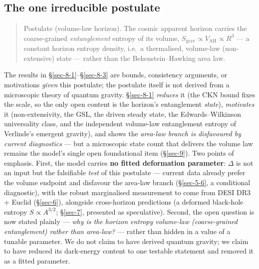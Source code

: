 \documentclass[preprint,12pt]{elsarticle}
\begin{document}
\subsection{The one irreducible postulate}\label{sec-8-4}

\begin{quote}
Postulate (volume-law horizon). The cosmic apparent horizon carries the
coarse-grained \emph{entanglement} entropy of its volume,
\(S_{\mathrm{grav}} \propto  V_\mathrm{AH} \propto  R^{3}\) --- a
constant horizon entropy density, i.e.~a thermalised, volume-law
(non-extensive) state --- rather than the Bekenstein--Hawking area law.
\end{quote}

The results in §\ref{sec-8-1}--§\ref{sec-8-3} are bounds, consistency
arguments, or motivations \emph{given} this postulate; the postulate
itself is not derived from a microscopic theory of quantum gravity.
§\ref{sec-8-1} \emph{reduces} it (the CKN bound fixes the scale, so the
only open content is the horizon's entanglement \emph{state}),
\emph{motivates} it (non-extensivity, the GSL, the driven steady state,
the Edwards--Wilkinson universality class, and the independent
volume-law entanglement entropy of Verlinde's emergent gravity), and
shows the \emph{area-law branch is disfavoured by current diagnostics}
--- but a microscopic state count that delivers the volume law remains
the model's single open foundational item (§\ref{sec-9}). Two points of
emphasis. First, the model carries \textbf{no fitted deformation
parameter}: \(\Delta\) is not an input but the falsifiable \emph{test}
of this postulate --- current data already prefer the volume endpoint
and disfavour the area-law branch (§\ref{sec-5-6}, a conditional
diagnostic), with the robust marginalised measurement to come from DESI
DR3 + Euclid (§\ref{sec-6}), alongside cross-horizon predictions (a
deformed black-hole entropy \(S \propto  A^{3/2}\); §\ref{sec-7},
presented as speculative). Second, the open question is now stated
plainly --- \emph{why is the horizon entropy volume-law (coarse-grained
entanglement) rather than area-law?} --- rather than hidden in a value
of a tunable parameter. We do not claim to have derived quantum gravity;
we claim to have reduced its dark-energy content to one testable
statement and removed it as a fitted parameter.
\end{document}
